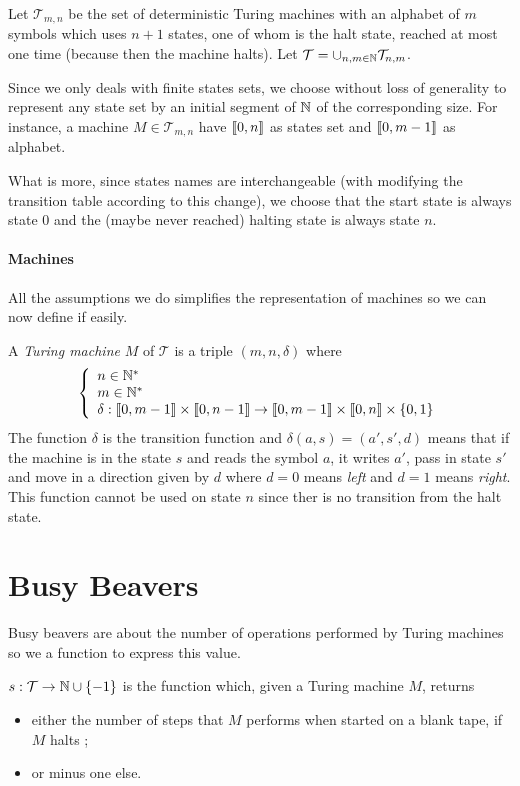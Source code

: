 \documentclass{report}
\begin{document}
 Let $\mathcal{T}_{m,n}$ be the set of deterministic Turing machines with an alphabet of $m$ symbols which uses $n + 1$ states, one of whom is the halt state, reached at most one time (because then the machine halts). Let  $\mathcal{T} = \cup_{n,m \in \mathbb{N}} \mathcal{T}_{n,m}$.

Since we only deals with finite states sets, we choose without loss of generality to represent any state set by an initial segment of $\mathbb{N}$ of the corresponding size. For instance, a machine $M \in \mathcal{T}_{m,n}$ have $\llbracket 0, n \rrbracket$ as states set and $\llbracket 0, m-1 \rrbracket$ as alphabet.

What is more, since states names are interchangeable (with modifying the transition table according to this change), we choose that the start state is always state $0$ and the (maybe never reached) halting state is always state $n$.



\paragraph{Machines}
All the assumptions we do simplifies the representation of machines so we can now define if easily.

\begin{Def}

A \emph{Turing machine} $M$ of $\mathcal{T}$ is a triple $(m,n,\delta)$ where 
\[
\left \{
\begin{array}{l}
  n \in \mathbb{N}^*\\
  m \in \mathbb{N}^*\\
  \delta : \llbracket 0, m-1 \rrbracket \times \llbracket 0, n-1 \rrbracket \to \llbracket 0, m-1 \rrbracket \times \llbracket 0, n \rrbracket \times \{0,1\}
\end{array}
\right .
\]
The function $\delta$ is the transition function and $\delta(a, s) = (a', s', d)$ means that if the machine is in the state $s$ and reads the symbol $a$, it writes $a'$, pass in state $s'$ and move in a direction given by $d$ where $d = 0$ means \emph{left} and $d = 1$ means \emph{right}. This function cannot be used on state $n$ since ther is no transition from the halt state.  
\end{Def}


\section{Busy Beavers}
\label{sec:bb}

Busy beavers are about the number of operations performed by Turing machines so we a function to express this value.
\begin{Def}[$s$ function]
  $s : \mathcal{T} \to \mathbb{N} \cup \{-1\}$ is the function which, given a Turing machine $M$, returns
  \begin{itemize}
  \item either the number of steps that $M$ performs when started on a blank tape, if $M$ halts ;
  \item or minus one else.
  \end{itemize}
\end{Def}
\end{document}

